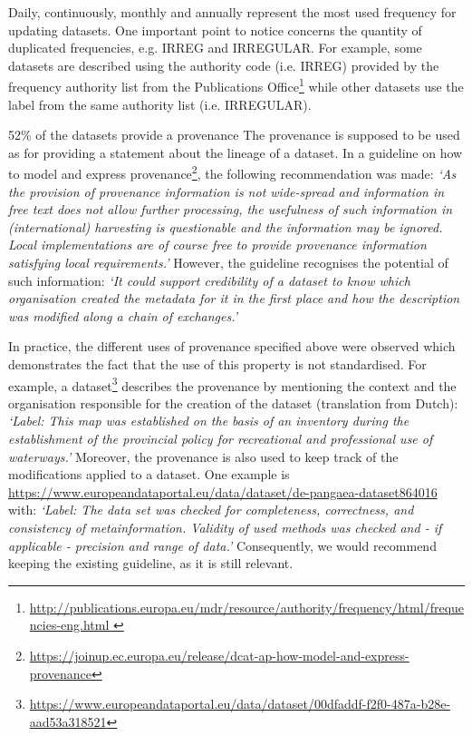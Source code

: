 \documentclass[<options>]{elsarticle}
\begin{document}
Daily, continuously, monthly and annually represent the most used frequency for updating datasets. One important point to notice concerns the quantity of duplicated frequencies, e.g. IRREG and IRREGULAR. For example, some datasets are described using the authority code (i.e. IRREG) provided by the frequency authority list from the Publications Office\footnote{\href{ http://publications.europa.eu/mdr/resource/authority/frequency/html/frequencies-eng.html }{   http://publications.europa.eu/mdr/resource/authority/frequency/html/frequencies-eng.html }} while other datasets use the label from the same authority list (i.e. IRREGULAR). 

52\% of the datasets provide a provenance
The provenance is supposed to be used as for providing a statement about the lineage of a dataset. In a guideline on how to model and express provenance\footnote{\href{  https://joinup.ec.europa.eu/release/dcat-ap-how-model-and-express-provenance}{  https://joinup.ec.europa.eu/release/dcat-ap-how-model-and-express-provenance}}, the following recommendation was made: \textit{‘As the provision of provenance information is not wide-spread and information in free text does not allow further processing, the usefulness of such information in (international) harvesting is questionable and the information may be ignored. Local implementations are of course free to provide provenance information satisfying local requirements.’ }However, the guideline recognises the potential of such information: \textit{‘It could support credibility of a dataset to know which organisation created the metadata for it in the first place and how the description was modified along a chain of exchanges.’}

In practice, the different uses of provenance specified above were observed which demonstrates the fact that the use of this property is not standardised. For example, a dataset\footnote{\href{  https://www.europeandataportal.eu/data/dataset/00dfaddf-f2f0-487a-b28e-aad53a318521}{   https://www.europeandataportal.eu/data/dataset/00dfaddf-f2f0-487a-b28e-aad53a318521}} describes the provenance by mentioning the context and the organisation responsible for the creation of the dataset (translation from Dutch): \textit{‘Label: This map was established on the basis of an inventory during the establishment of the provincial policy for recreational and professional use of waterways.’}
Moreover, the provenance is also used to keep track of the modifications applied to a dataset. One example is \url{https://www.europeandataportal.eu/data/dataset/de-pangaea-dataset864016} with: \textit{‘Label: The data set was checked for completeness, correctness, and consistency of metainformation. Validity of used methods was checked and - if applicable - precision and range of data.’}
Consequently, we would recommend keeping the existing guideline, as it is still relevant.
\end{document}
